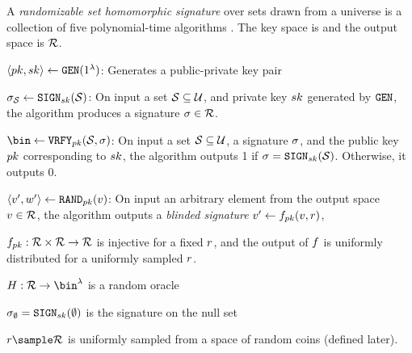\begin{definition}
	A \textit{randomizable set homomorphic signature} over sets drawn from a universe \universe is a 
	collection of five polynomial-time algorithms \ourSigSchemeDefn. The key space is \sigKeySpace and the output space is $\sigOutputSpace$.
	
	\itemListStart
		\item $\keyPair \assign \keyGen(1^{\secParam})$: Generates a public-private key pair 	

		\item $\genericSig[\genericSetVar] \assign \signingAlg[\privKey](\genericSetVar)$: On input a set 
		$\genericSetVar \subseteq 
		\universe$, and private key $\privKey$ generated by $\keyGen$, the algorithm produces a 
		signature $\genericSig \in \sigOutputSpace$.
		
		
		\item $\bin \assign \verify[\pubKey](\genericSetVar, \genericSig)$:
		On input a set $\genericSetVar \subseteq
		\universe$, a signature $\genericSig$, and the
		public key $\pubKey$ corresponding to $\privKey$,
		the algorithm outputs 1 if $\genericSig =
		\signingAlg[\privKey](\genericSetVar)$. Otherwise, it outputs 0. 
		
		\item $\genericSigPairAlt \assign \randomize[\pubKey](\genericSigPair[1])$: On input an arbitrary element from 
		the output space $\genericSigPair[1] \in \sigOutputSpace$, the algorithm outputs a \emph{blinded signature} $\genericSigPairAlt[1] \gets \randomizeFn[\pubKey](\genericSigPair[1],\genericRand)$,  


\itemListStart
 \item $\randomizeFn[\pubKey]: \sigOutputSpace \times \genericRandSpace \rightarrow 
		\sigOutputSpace$ is injective for a fixed $\genericRand$, and the output of $\randomizeFn$ is uniformly distributed for a uniformly sampled $\genericRand$. 
\item $\ro: \sigOutputSpace \rightarrow \bin^{\secParam}$ is a random oracle
\item  $\genericSig[\emptyset] = \signingAlg[\privKey](\emptyset)$ is the signature on the null set
\item $\genericRand \getsr \genericRandSpace$ is uniformly sampled from a space of random coins (defined later). 
\itemListEnd


\end{definition}
